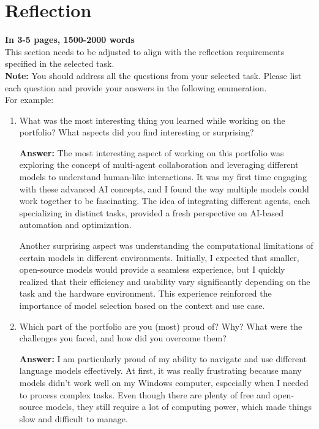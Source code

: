 \section{Reflection}
\label{sec:reflection}

\textbf{In 3-5 pages, 1500-2000 words}\\

This section needs to be adjusted to align with the reflection requirements specified in the selected task.\\

\textbf{Note:} You should address all the questions from your selected task. Please list each question and provide your answers in the following enumeration.\\

For example:
\begin{enumerate}
    \item What was the most interesting thing you learned while working on the portfolio? What aspects did you find interesting or surprising? 
    
     \textbf{Answer:} 
     The most interesting aspect of working on this portfolio was exploring the concept of multi-agent collaboration and leveraging different models to understand human-like interactions. It was my first time engaging with these advanced AI concepts, and I found the way multiple models could work together to be fascinating. The idea of integrating different agents, each specializing in distinct tasks, provided a fresh perspective on AI-based automation and optimization.
     
     Another surprising aspect was understanding the computational limitations of certain models in different environments. Initially, I expected that smaller, open-source models would provide a seamless experience, but I quickly realized that their efficiency and usability vary significantly depending on the task and the hardware environment. This experience reinforced the importance of model selection based on the context and use case.

     \item Which part of the portfolio are you (most) proud of? Why? What were the challenges you faced, and how did you overcome them? 
    
     \textbf{Answer:}
     I am particularly proud of my ability to navigate and use different language models effectively. At first, it was really frustrating because many models didn’t work well on my Windows computer, especially when I needed to process complex tasks. Even though there are plenty of free and open-source models, they still require a lot of computing power, which made things slow and difficult to manage.


\end{enumerate}
